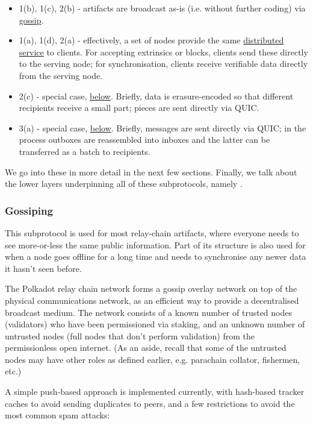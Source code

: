 \begin{itemize}
\item 1(b), 1(c), 2(b) - artifacts are broadcast as-is (i.e. without further coding) via \hyperref[sec:gossiping]{gossip}.
\item 1(a), 1(d), 2(a) - effectively, a set of nodes provide the same \hyperref[sec:net_service]{distributed service} to clients. For accepting extrinsics or blocks, clients send these directly to the serving node; for synchronisation, clients receive verifiable data directly from the serving node.
\item 2(c) - special case, \hyperref[sec:net_storage]{below}. Briefly, data is erasure-encoded so that different recipients receive a small part; pieces are sent directly via QUIC.
\item 3(a) - special case, \hyperref[sec:net_crosschain]{below}. Briefly, messages are sent directly via QUIC; in the process outboxes are reassembled into inboxes and the latter can be transferred as a batch to recipients.
\end{itemize}

We go into these in more detail in the next few sections. Finally, we talk about the lower layers underpinning all of these subprotocols, namely .

\subsubsection{Gossiping} \label{sec:gossiping}

This subprotocol is used for most relay-chain artifacts, where everyone needs to see more-or-less the same public information. Part of its structure is also used for when a node goes offline for a long time and needs to synchronise any newer data it hasn't seen before.

The Polkadot relay chain network forms a gossip overlay network on top of the physical communications network, as an efficient way to provide a decentralised broadcast medium. The network consists of a known number of trusted nodes (validators) who have been permissioned via staking, and an unknown number of untrusted nodes (full nodes that don't perform validation) from the permissionless open internet. (As an aside, recall that some of the untrusted nodes may have other roles as defined earlier, e.g. parachain collator, fishermen, etc.)

A simple push-based approach is implemented currently, with hash-based tracker caches to avoid sending duplicates to peers, and a few restrictions to avoid the most common spam attacks:

